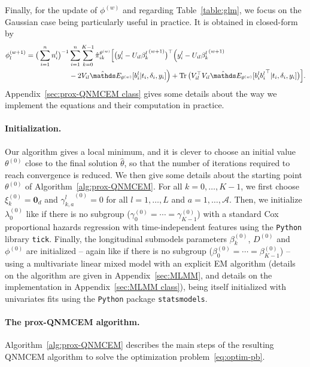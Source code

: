 \documentclass[11pt]{article}
\DeclareMathOperator{\Tr}{Tr}
\newcommand{\cA}{\mathcal A}
\newcommand{\E}{\mathds E}
\begin{document}
Finally, for the update of $\phi^{(w)}$ and regarding Table~\ref{table:glm}, we focus on the Gaussian case being particularly useful in practice. It is obtained in closed-form by
\begin{align}
  \label{eq:update_phi}
  \phi_l^{(w+1)} = \big(\sum_{i=1}^n n_i^l \big)^{-1} &\sum_{i=1}^n \sum_{k=0}^{K-1} \hat \pi_{ik}^{\theta^{(w)}} \Big[ \big(y_i^l - U_{il} {\beta_k^l}^{(w+1)}\big)^\top \Big(y_i^l - U_{il} {\beta_k^l}^{(w+1)} \nonumber \\
  & - 2V_{il} \hat \E_{\theta^{(w)}}[ b_i^l | t_i, \delta_i, y_i]\Big) + \Tr\big(V_{il}^\top V_{il}\hat \E_{\theta^{(w)}}[ b_i^l {b_i^l}^\top | t_i, \delta_i, y_i]\big) \Big].
\end{align}
Appendix~\ref{sec:prox-QNMCEM class} gives some details about the way we implement the equations and their computation in practice.

\paragraph*{Initialization.}
Our algorithm gives a local minimum, and it is clever to choose an initial value $\theta^{(0)}$ close to the final solution $\hat \theta$, so that the number of iterations required to reach convergence is reduced. We then give some details about the starting point $\theta^{(0)}$ of Algorithm~\ref{alg:prox-QNMCEM}. 
For all $k = 0, \ldots, K-1$, we first choose $\xi_k^{(0)} = \mathbf{0}_d$ and ${\gamma_{k,a}^l}^{(0)} = 0$ for all $l=1, \ldots, L$ and $a=1, \ldots, \cA$. Then, we initialize $\lambda_0^{(0)}$ like if there is no subgroup ($\gamma_{0}^{(0)} = \cdots = \gamma_{K-1}^{(0)}$) with a standard Cox proportional hazards regression with time-independent features using the \texttt{Python} library \texttt{tick}. Finally, the longitudinal submodels parameters $\beta_k^{(0)}$, $D^{(0)}$ and $\phi^{(0)}$ are initialized -- again like if there is no subgroup ($\beta_0^{(0)} = \cdots = \beta_{K-1}^{(0)}$) -- using a multivariate linear mixed model with an explicit EM algorithm (details on the algorithm are given in Appendix~\ref{sec:MLMM}, and details on the implementation in Appendix~\ref{sec:MLMM class}), being itself initialized with univariates fits using the \texttt{Python} package \texttt{statsmodels}.

\paragraph*{The prox-QNMCEM algorithm.}
Algorithm~\ref{alg:prox-QNMCEM} describes the main steps of the resulting QNMCEM algorithm to solve the optimization problem~\eqref{eq:optim-pb}. 
\end{document}

